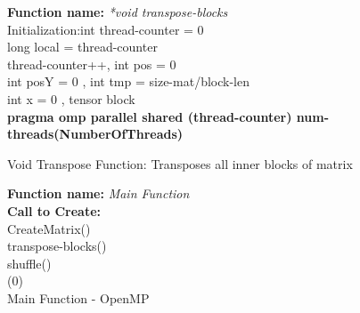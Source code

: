\documentclass[10pt,journal]{article}
\begin{document}
\begin{algorithm}[H]
\SetAlgoLined
\textbf{Function name:} \emph{*void transpose-blocks}\\
Initialization\::int thread-counter = 0\\
    long local = thread-counter\\
    thread-counter++, int pos = 0\\
    int posY = 0 , int tmp = size-mat/block-len\\
    int x = 0 , tensor block\\

\vspace{10pt} 
\textbf{pragma omp parallel shared (thread-counter) num-threads(NumberOfThreads)}\\
\caption{Void Transpose Function: Transposes all inner blocks of matrix}
\end{algorithm}

\begin{algorithm}[H]
\SetAlgoLined
\textbf{Function name:} \emph{Main Function}\\
\textbf{Call to Create\::}\\
CreateMatrix()\\
transpose-blocks()\\
shuffle()\\
\Return(0)\\

\caption{Main Function - OpenMP}
\end{algorithm}


\newpage
\end{document}
